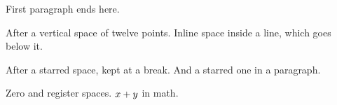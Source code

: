 \documentclass{article}
\begin{document}
\vspace*{1in}
First paragraph ends here.

\vspace{12pt}
After a vertical space of twelve points.
Inline \vspace{1em plus 2pt minus 1pt}space inside a line, which goes below it.

\vspace*{24pt plus 1fil}
After a starred space, kept at a break.
\vspace*{-3pt}And a starred one in a paragraph.

\vspace{0pt}
\vspace{0pt plus 1pt}
Zero and register spaces. $x \vspace{4pt} + y$ in math.
\end{document}
